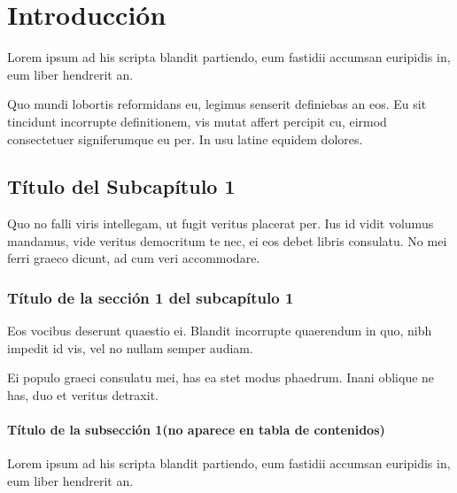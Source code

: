 \chapter[Introducción]{Introducción}\label{ch:capitulo1}
\fpar

\parindent=0pt Lorem ipsum ad his scripta blandit partiendo, eum fastidii accumsan euripidis in, eum liber hendrerit an. 

\vspace{0.5cm}
\parindent=30pt Quo mundi lobortis reformidans eu, legimus senserit definiebas an eos. Eu sit tincidunt incorrupte definitionem, vis mutat affert percipit cu, eirmod consectetuer signiferumque eu per. In usu latine equidem dolores.



\section{Título del Subcapítulo 1 }\label{chsub:Título del Subcapítulo 1}

\parindent=0pt Quo no falli viris intellegam, ut fugit veritus placerat per. Ius id vidit volumus mandamus, vide veritus democritum te nec, ei eos debet libris consulatu. No mei ferri graeco dicunt, ad cum veri accommodare. 


\subsection{Título de la sección 1 del subcapítulo 1}\label{chsub:Título de la sección 1 del subcapítulo 1}


\parindent=0pt Eos vocibus deserunt quaestio ei. Blandit incorrupte quaerendum in quo, nibh impedit id vis, vel no nullam semper audiam. 

\vspace{0.5cm}
\parindent=30pt Ei populo graeci consulatu mei, has ea stet modus phaedrum. Inani oblique ne has, duo et veritus detraxit. 


\subsubsection{Título de la subsección 1(no aparece en tabla de contenidos)}\label{chsub:Título de la subsección 1}

\parindent=0pt Lorem ipsum ad his scripta blandit partiendo, eum fastidii accumsan euripidis in, eum liber hendrerit an. 



